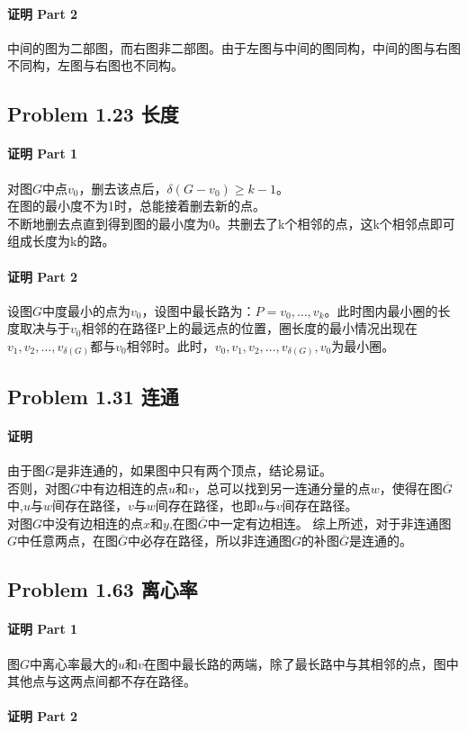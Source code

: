 \documentclass[17pt,UTF-8,a4paper]{ctexart}
\begin{document}
\paragraph*{证明 Part 2}
中间的图为二部图，而右图非二部图。由于左图与中间的图同构，中间的图与右图不同构，左图与右图也不同构。

\subsection*{Problem 1.23 长度} 
\paragraph*{证明 Part 1}
对图$G$中点$v_0$，删去该点后，$\delta({G-v_0})\geq{k-1}$。\\
在图的最小度不为1时，总能接着删去新的点。\\  
不断地删去点直到得到图的最小度为0。共删去了k个相邻的点，这k个相邻点即可组成长度为k的路。


\paragraph*{证明 Part 2}
设图$G$中度最小的点为$v_0$，设图中最长路为：$P=v_0,\dots,v_k$。此时图内最小圈的长度取决与于$v_0$相邻的在路径P上的最远点的位置，圈长度的最小情况出现在$v_1,v_2,\dots,v_{\delta(G)}$都与$v_0$相邻时。此时，$v_0,v_1,v_2,\dots,v_{\delta(G)},v_0$为最小圈。

\subsection*{Problem 1.31 连通}
\paragraph*{证明}
由于图$G$是非连通的，如果图中只有两个顶点，结论易证。\\
否则，对图$G$中有边相连的点$u$和$v$，总可以找到另一连通分量的点$w$，使得在图$\overline{G}$中,$u$与$w$间存在路径，$v$与$w$间存在路径，也即$u$与$v$间存在路径。\\
对图$G$中没有边相连的点$x$和$y$,在图$\overline{G}$中一定有边相连。
综上所述，对于非连通图$G$中任意两点，在图$\overline{G}$中必存在路径，所以非连通图$G$的补图$\overline{G}$是连通的。

\subsection*{Problem 1.63 离心率}
\paragraph*{证明 Part 1}
图$G$中离心率最大的$u$和$v$在图中最长路的两端，除了最长路中与其相邻的点，图中其他点与这两点间都不存在路径。\\


\paragraph*{证明 Part 2}
\end{document}

